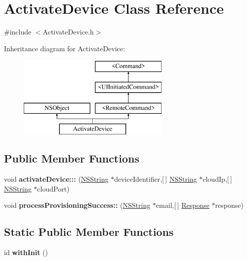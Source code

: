 \hypertarget{interface_activate_device}{
\section{\-Activate\-Device \-Class \-Reference}
\label{interface_activate_device}
}


{\ttfamily \#include $<$\-Activate\-Device.\-h$>$}

\-Inheritance diagram for \-Activate\-Device\-:\begin{figure}[H]
\begin{center}
\leavevmode
\includegraphics[height=4.000000cm]{interface_activate_device}
\end{center}
\end{figure}
\subsection*{\-Public \-Member \-Functions}
\begin{DoxyCompactItemize}
\item 
\hypertarget{interface_activate_device_a259ebc23ef852a20e3d1b38fd3d4bbe4}{
void {\bfseries activate\-Device\-:::} (\hyperlink{class_n_s_string}{\-N\-S\-String} $\ast$device\-Identifier,\mbox{[}$\,$\mbox{]} \hyperlink{class_n_s_string}{\-N\-S\-String} $\ast$cloud\-Ip,\mbox{[}$\,$\mbox{]} \hyperlink{class_n_s_string}{\-N\-S\-String} $\ast$cloud\-Port)}
\label{interface_activate_device_a259ebc23ef852a20e3d1b38fd3d4bbe4}

\item 
\hypertarget{interface_activate_device_aaf23b31fb95cf505526a372929ab1215}{
void {\bfseries process\-Provisioning\-Success\-::} (\hyperlink{class_n_s_string}{\-N\-S\-String} $\ast$email,\mbox{[}$\,$\mbox{]} \hyperlink{interface_response}{\-Response} $\ast$response)}
\label{interface_activate_device_aaf23b31fb95cf505526a372929ab1215}

\end{DoxyCompactItemize}
\subsection*{\-Static \-Public \-Member \-Functions}
\begin{DoxyCompactItemize}
\item 
\hypertarget{interface_activate_device_aab35a3c7b82f050aa5a51a205ae6afbc}{
id {\bfseries with\-Init} ()}
\label{interface_activate_device_aab35a3c7b82f050aa5a51a205ae6afbc}

\end{DoxyCompactItemize}


